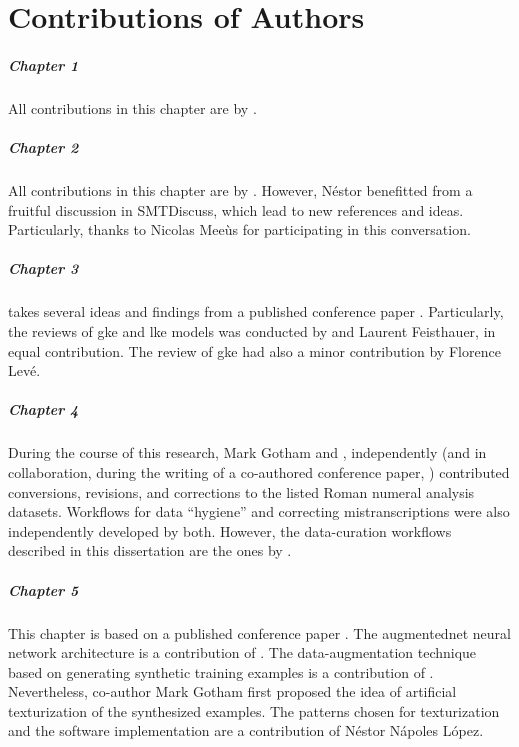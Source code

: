 \chapter*{Contributions of Authors}
\label{chap:contributionsofauthors}

\paragraph{Chapter 1}
All contributions in this chapter are by \myself{}.

\paragraph{Chapter 2}
All contributions in this chapter are by \myself{}. However,
N\'estor benefitted from a fruitful discussion in
SMTDiscuss,
which lead to new references and ideas. Particularly, thanks
to Nicolas Mee\`us for participating in this conversation.

\paragraph{Chapter 3} 
 takes several ideas and findings
from a published conference paper
\parencite{napoleslopez2020local}. Particularly, the reviews
of \gls{gke} and \gls{lke} models was conducted by \myself{}
and Laurent Feisthauer, in equal contribution. The review of
\gls{gke} had also a minor contribution by Florence Lev\'e.

\paragraph{Chapter 4} 
During the course of this research, Mark Gotham and
\myself{}, independently (and in collaboration, during the
writing of a co-authored conference paper,
\textcite{napoleslopez2021augmentednet}) contributed
conversions, revisions, and corrections to the listed Roman
numeral analysis datasets. Workflows for data ``hygiene''
and correcting mistranscriptions were also independently
developed by both. However, the data-curation workflows
described in this dissertation are the ones by \myself{}. 

\paragraph{Chapter 5}
This chapter is based on a published conference paper
\parencite{napoleslopez2021augmentednet}. The
\gls{augmentednet} neural network architecture is a
contribution of \myself{}. The data-augmentation technique
based on generating synthetic training examples is a
contribution of \myself{}. Nevertheless, co-author Mark
Gotham first proposed the idea of artificial texturization
of the synthesized examples. The patterns chosen for
texturization and the software implementation are a
contribution of N\'estor N\'apoles L\'opez.

